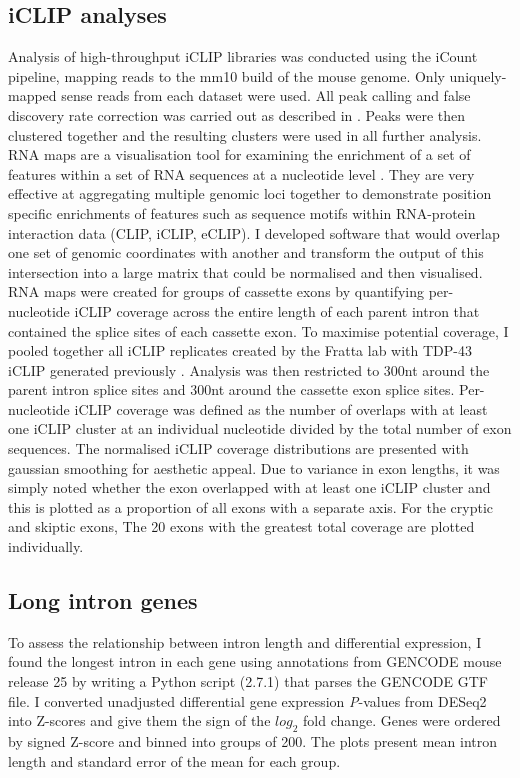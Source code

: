 \subsection{iCLIP analyses}
Analysis  of  high-throughput  iCLIP  libraries  was  conducted  using  the  iCount  pipeline,  mapping  reads  to  the mm10 build of the mouse genome.
Only  uniquely-mapped  sense  reads  from each dataset were used. All peak calling and false discovery rate correction was carried out as described in \citep{Huppertz2014-ip,Konig2010}.  
Peaks were then clustered together and the resulting clusters were used in all further analysis.
RNA maps are a visualisation tool for examining the enrichment of a set of features within a set of RNA sequences at a nucleotide level \citep{Ule2006}. 
They are very effective at aggregating multiple genomic loci together to demonstrate position specific enrichments of features such as sequence motifs within RNA-protein interaction data (CLIP, iCLIP, eCLIP). 
I developed software that would overlap one set of genomic coordinates with another and transform the output of this intersection into a large matrix that could be normalised and then visualised.  
RNA maps were created  for groups of cassette exons by quantifying per-nucleotide iCLIP coverage across the entire length of each parent intron that contained the splice sites of each cassette exon. 
To maximise  potential  coverage,  I pooled together all  iCLIP  replicates created  by the Fratta lab with  TDP-43  iCLIP generated previously \citep{Rogelj2012}. 
Analysis was  then  restricted  to 300nt around  the parent intron splice sites and 300nt around the cassette exon splice sites. 
Per-nucleotide iCLIP coverage was defined as the number of overlaps with at least one iCLIP cluster at an individual nucleotide divided by the total number of exon sequences. 
The normalised iCLIP coverage distributions are presented with gaussian smoothing for aesthetic appeal. 
Due to variance in exon lengths, it was simply noted whether the exon overlapped with at least one iCLIP cluster and this is plotted as a proportion of all exons with a separate axis. 
For the cryptic and skiptic exons, The 20 exons with the greatest total coverage are plotted individually. 

\subsection{Long intron genes}
To assess the relationship between intron length and differential expression, I found the longest intron in each gene using annotations from GENCODE mouse release 25 \citep{Harrow2012} by writing a Python script (2.7.1) that parses the GENCODE GTF file. 
I converted unadjusted differential gene expression \textit{P}-values from DESeq2 into Z-scores and give them the sign of the $log_2$ fold change. 
Genes were ordered by signed Z-score and binned into groups of  200. 
The plots present mean intron length and  standard error of the mean for each group.  


